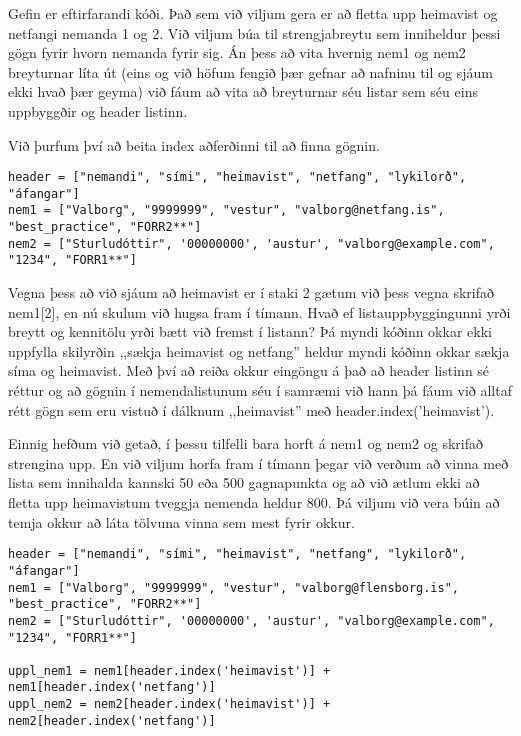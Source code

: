 \begin{exercise}\label{lst3}
Gefin er eftirfarandi kóði.
Það sem við viljum gera er að fletta upp heimavist og netfangi nemanda 1 og 2.
Við viljum búa til strengjabreytu sem inniheldur þessi gögn fyrir hvorn nemanda fyrir sig.
Án þess að vita hvernig nem1 og nem2 breyturnar líta út (eins og við höfum fengið þær gefnar að nafninu til og sjáum ekki hvað þær geyma) við fáum að vita að breyturnar séu listar sem séu eins uppbyggðir og header listinn.

Við þurfum því að beita index aðferðinni til að finna gögnin.
\begin{lstlisting}
header = ["nemandi", "sími", "heimavist", "netfang", "lykilorð", "áfangar"]
nem1 = ["Valborg", "9999999", "vestur", "valborg@netfang.is", "best_practice", "FORR2**"]
nem2 = ["Sturludóttir", '00000000', 'austur', "valborg@example.com", "1234", "FORR1**"]\end{lstlisting}

\end{exercise}
\begin{Answer}[ref={lst3}]
	Vegna þess að við sjáum að heimavist er í staki 2 gætum við þess vegna skrifað nem1[2], en nú skulum við hugsa fram í tímann.
	Hvað ef listauppbyggingunni yrði breytt og kennitölu yrði bætt við fremst í listann?
	Þá myndi kóðinn okkar ekki uppfylla skilyrðin ,,sækja heimavist og netfang'' heldur myndi kóðinn okkar sækja síma og heimavist.
	Með því að reiða okkur eingöngu á það að header listinn sé réttur og að gögnin í nemendalistunum séu í samræmi við hann þá fáum við alltaf rétt gögn sem eru vistuð í dálknum ,,heimavist'' með header.index('heimavist').


	Einnig hefðum við getað, í þessu tilfelli bara horft á nem1 og nem2 og skrifað strengina upp.
	En við viljum horfa fram í tímann þegar við verðum að vinna með lista sem innihalda kannski 50 eða 500 gagnapunkta og að við ætlum ekki að fletta upp heimavistum tveggja nemenda heldur 800.
	Þá viljum við vera búin að temja okkur að láta tölvuna vinna sem mest fyrir okkur. 
\begin{lstlisting}
header = ["nemandi", "sími", "heimavist", "netfang", "lykilorð", "áfangar"]
nem1 = ["Valborg", "9999999", "vestur", "valborg@flensborg.is", "best_practice", "FORR2**"]
nem2 = ["Sturludóttir", '00000000', 'austur', "valborg@example.com", "1234", "FORR1**"]

uppl_nem1 = nem1[header.index('heimavist')] + nem1[header.index('netfang')]
uppl_nem2 = nem2[header.index('heimavist')] + nem2[header.index('netfang')]\end{lstlisting}
\end{Answer}

